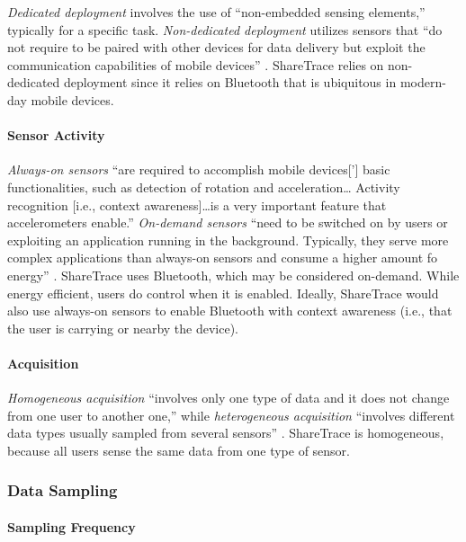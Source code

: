 \emph{Dedicated deployment} involves the use of ``non-embedded sensing elements,'' typically for a specific task. \emph{Non-dedicated deployment} utilizes sensors that ``do not require to be paired with other devices for data delivery but exploit the communication capabilities of mobile devices'' \citep{Capponi2019}. ShareTrace relies on non-dedicated deployment since it relies on Bluetooth that is ubiquitous in modern-day mobile devices.

\paragraph{Sensor Activity}

\emph{Always-on sensors} ``are required to accomplish mobile devices['] basic functionalities, such as detection of rotation and acceleration{\ldots} Activity recognition [i.e., context awareness]{\ldots}is a very important feature that accelerometers enable.'' \emph{On-demand sensors} ``need to be switched on by users or exploiting an application running in the background. Typically, they serve more complex applications than always-on sensors and consume a higher amount fo energy'' \citep{Capponi2019}. ShareTrace uses Bluetooth, which may be considered on-demand. While energy efficient, users do control when it is enabled. Ideally, ShareTrace would also use always-on sensors to enable Bluetooth with context awareness (i.e., that the user is carrying or nearby the device).

\paragraph{Acquisition}

\emph{Homogeneous acquisition} ``involves only one type of data and it does not change from one user to another one,'' while \emph{heterogeneous acquisition} ``involves different data types usually sampled from several sensors'' \citep{Capponi2019}. ShareTrace is homogeneous, because all users sense the same data from one type of sensor.

\subsubsection{Data Sampling}

\paragraph{Sampling Frequency}

